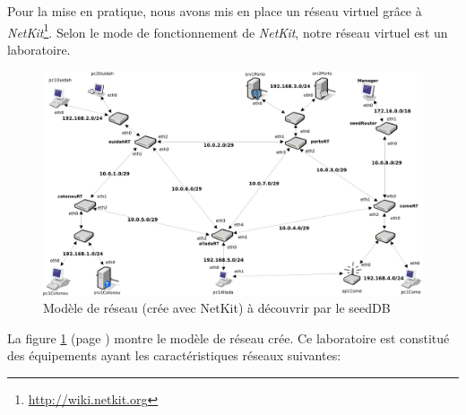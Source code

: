 Pour la mise en pratique, nous avons mis en place un réseau virtuel grâce à \emph{NetKit}\footnote{\url{http://wiki.netkit.org}}. Selon le mode de fonctionnement de \emph{NetKit}, notre réseau virtuel est un laboratoire.
\begin{figure}[H]
    \begin{center}
     \includegraphics[scale=0.3]{images/snmp_lab.pdf}
     \caption{Modèle de réseau (crée avec NetKit) à découvrir par le seedDB} \label {fig:snmp_lab} 
        \end{center}
   \end{figure}
La figure \ref{fig:snmp_lab} (page \pageref{fig:snmp_lab}) montre le modèle de réseau crée. Ce laboratoire est constitué des équipements ayant les caractéristiques réseaux suivantes:
